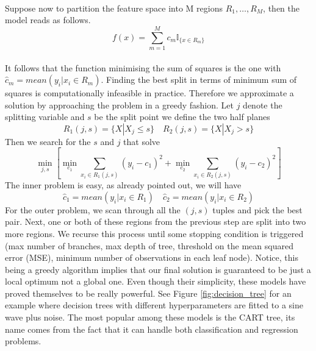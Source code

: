 \\
Suppose now to partition the feature space into M regions $R_1,\dots,R_M$, then the model reads as follows.
\begin{equation}
    f(x)=\sum\limits_{m=1}^{M}c_m\mathbb{I}_{\{x \in R_m\}}
\end{equation}
\\
It follows that the function minimising the sum of squares is the one with $\hat{c}_m=mean(y_i|x_i \in R_m)$.
Finding the best split in terms of minimum sum of squares is computationally infeasible in practice. Therefore we approximate a solution by approaching the problem in a greedy fashion.
Let $j$ denote the splitting variable and $s$ be the split point we define the two half planes
\begin{equation}
    R_1(j,s)=\{X|X_j\leq s\} \quad R_2(j,s)=\{X|X_j >s\}
\end{equation}
Then we search for the $s$ and $j$ that solve
\begin{equation}
    \min_{j,s}\left[\min_{c_1} \sum\limits_{x_i \in R_1(j,s)}(y_i-c_1)^2+\min_{c_2} \sum\limits_{x_i \in R_2(j,s)}(y_i-c_2)^2\right]
\end{equation}
The inner problem is easy, as already pointed out, we will have 
\begin{equation}
    \hat{c}_1=mean(y_i|x_i \in R_1) \quad \hat{c}_2=mean(y_i|x_i \in R_2)
\end{equation}
For the outer problem, we scan through all the $(j,s)$ tuples and pick the best pair. 
Next, one or both of these regions from the previous step are split into two more regions. We recurse this process until some stopping condition is triggered (max number of branches, max depth of tree, threshold on the mean squared error (MSE), minimum number of observations in each leaf node).
Notice, this being a greedy algorithm implies that our final solution is guaranteed to be just a local optimum not a global one.
Even though their simplicity, these models have proved themselves to be really powerful. See Figure \ref{fig:decision_tree} for an example where decision trees with different hyperparameters are fitted to a sine wave plus noise. The most popular among these models is the CART \cite{breiman2017classification} tree, its name comes from the fact that it can handle both classification and regression problems.
